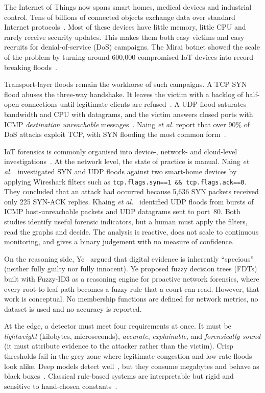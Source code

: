 \documentclass[conference]{IEEEtran}
\begin{document}
The Internet of Things now spans smart homes, medical devices and industrial control. Tens of billions of connected objects exchange data over standard Internet protocols~\cite{naing2023}. Most of these devices have little memory, little CPU and rarely receive security updates. This makes them both easy victims and easy recruits for denial-of-service (DoS) campaigns. The Mirai botnet showed the scale of the problem by turning around 600,000 compromised IoT devices into record-breaking floods~\cite{antonakakis2017,kolias2017}.

Transport-layer floods remain the workhorse of such campaigns. A TCP SYN flood abuses the three-way handshake. It leaves the victim with a backlog of half-open connections until legitimate clients are refused~\cite{eddy2007,cert1996}. A UDP flood saturates bandwidth and CPU with datagrams, and the victim answers closed ports with ICMP \emph{destination unreachable} messages~\cite{khaing2020}. Naing \emph{et al.} report that over 90\% of DoS attacks exploit TCP, with SYN flooding the most common form~\cite{naing2023}.

IoT forensics is commonly organised into device-, network- and cloud-level investigations~\cite{stoyanova2020}. At the network level, the state of practice is manual. Naing \emph{et al.}~\cite{naing2023} investigated SYN and UDP floods against two smart-home devices by applying Wireshark filters such as \texttt{tcp.flags.syn==1 \&\& tcp.flags.ack==0}. They concluded that an attack had occurred because 5,636 SYN packets received only 225 SYN-ACK replies. Khaing \emph{et al.}~\cite{khaing2020} identified UDP floods from bursts of ICMP host-unreachable packets and UDP datagrams sent to port~80. Both studies identify useful forensic indicators, but a human must apply the filters, read the graphs and decide. The analysis is reactive, does not scale to continuous monitoring, and gives a binary judgement with no measure of confidence.

On the reasoning side, Ye~\cite{ye2022} argued that digital evidence is inherently ``specious'' (neither fully guilty nor fully innocent). Ye proposed fuzzy decision trees (FDTs) built with Fuzzy-ID3 as a reasoning engine for proactive network forensics, where every root-to-leaf path becomes a fuzzy rule that a court can read. However, that work is conceptual. No membership functions are defined for network metrics, no dataset is used and no accuracy is reported.

At the edge, a detector must meet four requirements at once. It must be \emph{lightweight} (kilobytes, microseconds), \emph{accurate}, \emph{explainable}, and \emph{forensically sound} (it must attribute evidence to the attacker rather than the victim). Crisp thresholds fail in the grey zone where legitimate congestion and low-rate floods look alike. Deep models detect well~\cite{doshi2018,meidan2018}, but they consume megabytes and behave as black boxes~\cite{adadi2018}. Classical rule-based systems are interpretable but rigid and sensitive to hand-chosen constants~\cite{bridges2000}.
\end{document}

